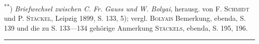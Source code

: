 \par\noindent\hspace*{\parindent}\textsuperscript{**}) \textit{Briefwechsel zwischen C. Fr. Gauss und W. Bolyai}, herausg. von F. \textsc{Schmidt} und P. \textsc{Stäckel}, Leipzig 1899, S. 133, 5); vergl. \textsc{Bolyais} Bemerkung, ebenda, S. 139 und die zu S. 133—134 gehörige Anmerkung \textsc{Stäckels}, ebenda, S. 195, 196.
\par\bigskip\begin{center}\rule{.24\linewidth}{.4pt}\end{center}
\endgroup
{}
